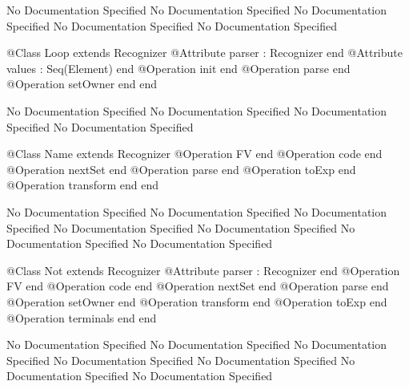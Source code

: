 No Documentation Specified
No Documentation Specified
No Documentation Specified
No Documentation Specified
No Documentation Specified
\begin{Interface}
@Class Loop extends Recognizer
  @Attribute parser : Recognizer end
  @Attribute values : Seq(Element) end
  @Operation init end
  @Operation parse end
  @Operation setOwner end
end
\end{Interface}
No Documentation Specified
No Documentation Specified
No Documentation Specified
No Documentation Specified
\begin{Interface}
@Class Name extends Recognizer
  @Operation FV end
  @Operation code end
  @Operation nextSet end
  @Operation parse end
  @Operation toExp end
  @Operation transform end
end
\end{Interface}
No Documentation Specified
No Documentation Specified
No Documentation Specified
No Documentation Specified
No Documentation Specified
No Documentation Specified
No Documentation Specified
\begin{Interface}
@Class Not extends Recognizer
  @Attribute parser : Recognizer end
  @Operation FV end
  @Operation code end
  @Operation nextSet end
  @Operation parse end
  @Operation setOwner end
  @Operation transform end
  @Operation toExp end
  @Operation terminals end
end
\end{Interface}
No Documentation Specified
No Documentation Specified
No Documentation Specified
No Documentation Specified
No Documentation Specified
No Documentation Specified
No Documentation Specified
